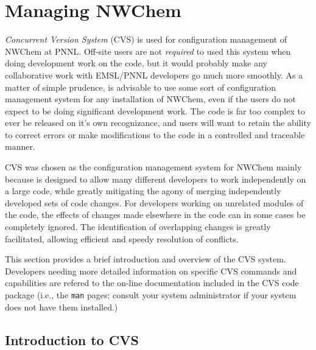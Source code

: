 \section{Managing NWChem}
\label{sec:cvs-intro}

{\it Concurrent Version System} (CVS) is used for configuration management of
NWChem at PNNL.  Off-site users are not {\em required} to used this system when 
doing development work on the code, but it would probably make any collaborative
work with EMSL/PNNL developers go much more smoothly.  As a matter of simple
prudence, is advisable to use some sort
of configuration management system for any installation of NWChem, even if
the users do not expect to be doing significant development work.  The code
is far too complex to ever be released on it's own recognizance, and users
will want to retain the ability to correct errors or make modifications to the
code in a controlled and traceable manner.  

CVS was chosen as the configuration management system for NWChem mainly
because is designed to allow many different developers to work independently
on a large code, while greatly mitigating the agony of merging independently
developed sets of code changes.  For developers working on unrelated modules
of the code, the effects of changes made elsewhere in the code can in some cases
be completely ignored.  The identification of overlapping changes is greatly
facilitated, allowing efficient and speedy resolution of conflicts.

This section provides a brief introduction and overview of the CVS system.
Developers needing more detailed information on specific CVS commands and
capabilities are refered to the on-line documentation included in the CVS 
code package (i.e., the \verb+man+ pages; consult your system administrator
if your system does not have them installed.)

\subsection{Introduction to CVS}



